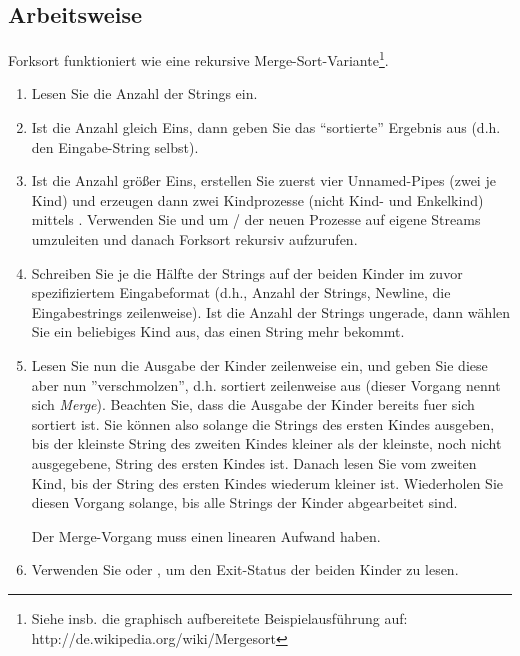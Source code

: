 \subsection*{Arbeitsweise}
Forksort funktioniert wie eine rekursive Merge-Sort-Variante\footnote{Siehe insb. die graphisch aufbereitete Beispielausf{\"u}hrung auf: http://de.wikipedia.org/wiki/Mergesort}.
\begin{enumerate}
\item Lesen Sie die Anzahl der Strings ein.
\item Ist die Anzahl gleich Eins, dann geben Sie das "`sortierte"' Ergebnis
  aus (d.h. den Eingabe-String selbst).
\item Ist die Anzahl größer Eins, erstellen Sie zuerst vier Unnamed-Pipes (zwei
  je Kind) und erzeugen dann zwei Kindprozesse (nicht Kind- und Enkelkind) mittels
  . Verwenden Sie 
  und  um / der neuen
  Prozesse auf eigene Streams umzuleiten und danach Forksort rekursiv
  aufzurufen.
\item Schreiben Sie je die Hälfte der Strings auf  der
  beiden Kinder im zuvor spezifiziertem Eingabeformat (d.h., Anzahl der Strings,
  Newline, die Eingabestrings zeilenweise).
  Ist die Anzahl der Strings ungerade, dann wählen Sie
  ein beliebiges Kind aus, das einen String mehr bekommt.
\item Lesen Sie nun die Ausgabe der Kinder zeilenweise ein, und
  geben Sie diese aber nun ''verschmolzen'', d.h. sortiert zeilenweise aus
  (dieser Vorgang nennt sich \emph{Merge}).
  Beachten Sie, dass die Ausgabe der Kinder bereits fuer
  sich sortiert ist.  Sie können also
  solange die Strings des ersten Kindes ausgeben, bis der kleinste String des
  zweiten Kindes kleiner als der kleinste, noch nicht ausgegebene, String des
  ersten Kindes ist. Danach lesen Sie vom zweiten Kind, bis der String des
  ersten Kindes wiederum kleiner ist. Wiederholen Sie diesen Vorgang solange,
  bis alle Strings der Kinder abgearbeitet sind.

  Der Merge-Vorgang muss einen linearen Aufwand haben.
\item Verwenden Sie  oder , um den
  Exit-Status der beiden Kinder zu lesen.
\end{enumerate}

